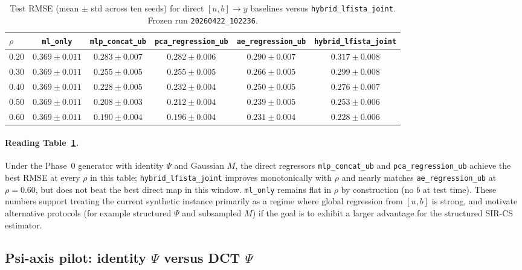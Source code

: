 \begin{table}[t]
  \centering
  \caption{Test RMSE (mean $\pm$ std across ten seeds) for direct $[u,b]\to y$ baselines versus \texttt{hybrid\_lfista\_joint}.
  Frozen run \texttt{20260422\_102236}.}
  \label{tab:direct_ub_rmse}
  \small
  \begin{tabular}{@{}lccccc@{}}
    \toprule
    $\rho$ & \texttt{ml\_only} & \texttt{mlp\_concat\_ub} & \texttt{pca\_regression\_ub} & \texttt{ae\_regression\_ub} & \texttt{hybrid\_lfista\_joint} \\
    \midrule
    $0.20$ & $0.369 \pm 0.011$ & $0.283 \pm 0.007$ & $\mathbf{0.282 \pm 0.006}$ & $0.290 \pm 0.007$ & $0.317 \pm 0.008$ \\
    $0.30$ & $0.369 \pm 0.011$ & $0.255 \pm 0.005$ & $\mathbf{0.255 \pm 0.005}$ & $0.266 \pm 0.005$ & $0.299 \pm 0.008$ \\
    $0.40$ & $0.369 \pm 0.011$ & $\mathbf{0.228 \pm 0.005}$ & $0.232 \pm 0.004$ & $0.250 \pm 0.005$ & $0.276 \pm 0.007$ \\
    $0.50$ & $0.369 \pm 0.011$ & $\mathbf{0.208 \pm 0.003}$ & $0.212 \pm 0.004$ & $0.239 \pm 0.005$ & $0.253 \pm 0.006$ \\
    $0.60$ & $0.369 \pm 0.011$ & $\mathbf{0.190 \pm 0.004}$ & $0.196 \pm 0.004$ & $0.231 \pm 0.004$ & $0.228 \pm 0.006$ \\
    \bottomrule
  \end{tabular}
\end{table}

\paragraph{Reading Table~\ref{tab:direct_ub_rmse}.}
Under the Phase~0 generator with identity $\Psi$ and Gaussian $M$, the direct regressors \texttt{mlp\_concat\_ub} and \texttt{pca\_regression\_ub} achieve the best RMSE at every $\rho$ in this table; \texttt{hybrid\_lfista\_joint} improves monotonically with $\rho$ and nearly matches \texttt{ae\_regression\_ub} at $\rho=0.60$, but does not beat the best direct map in this window.
\texttt{ml\_only} remains flat in $\rho$ by construction (no $b$ at test time).
These numbers support treating the current synthetic instance primarily as a regime where global regression from $[u,b]$ is strong, and motivate alternative protocols (for example structured $\Psi$ and subsampled $M$) if the goal is to exhibit a larger advantage for the structured SIR-CS estimator.

\subsection{Psi-axis pilot: identity $\Psi$ versus DCT $\Psi$}
\label{sec:direct_ub_psi_ablation}

